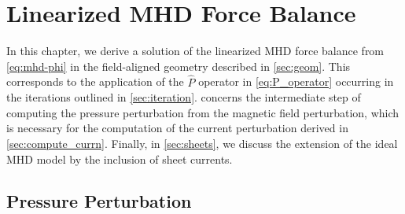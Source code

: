 \section{Linearized MHD Force Balance}
\label{sec:linmhd}

In this chapter, we derive a solution of the linearized MHD force balance from \cref{eq:mhd-phi} in the field-aligned geometry described in \cref{sec:geom}. This corresponds to the application of the $\hat{P}$ operator in \cref{eq:P_operator} occurring in the iterations outlined in \cref{sec:iteration}.  concerns the intermediate step of computing the pressure perturbation from the magnetic field perturbation, which is necessary for the computation of the current perturbation derived in \cref{sec:compute_currn}. Finally, in \cref{sec:sheets}, we discuss the extension of the ideal MHD model by the inclusion of sheet currents.

\subsection{Pressure Perturbation}
\label{sec:compute_presn}

